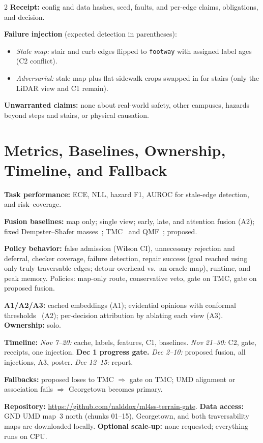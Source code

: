 \documentclass[10pt]{article}
\newcommand{\cl}[1]{\texttt{#1}}
\begin{document}
\begin{multicols*}{2}
\textbf{Receipt:} config and data hashes, seed, faults, and per-edge claims, obligations, and decision.

\textbf{Failure injection} (expected detection in parentheses):
\begin{itemize}\setlength\itemsep{0pt}\setlength\parskip{0pt}
	\item \emph{Stale map:} stair and curb edges flipped to \cl{footway} with assigned label ages (C2 conflict).
	\item \emph{Adversarial:} stale map plus flat-sidewalk crops swapped in for stairs (only the LiDAR view and C1 remain).
\end{itemize}

\textbf{Unwarranted claims:} none about real-world safety, other campuses, hazards beyond steps and
stairs, or physical causation.

\section{Metrics, Baselines, Ownership, Timeline, and Fallback}

\textbf{Task performance:} ECE, NLL, hazard F1, AUROC for stale-edge detection, and risk--coverage.

\textbf{Fusion baselines:} map only; single view; early, late, and attention fusion (A2); fixed
Dempster--Shafer masses~\cite{valente2018}; TMC~\cite{han2023} and QMF~\cite{zhang2023}; proposed.

\textbf{Policy behavior:} false admission (Wilson CI), unnecessary rejection and deferral, checker
coverage, failure detection, repair success (goal reached using only truly traversable edges; detour
overhead vs.\ an oracle map), runtime, and peak memory. Policies: map-only route, conservative veto,
gate on TMC, gate on proposed fusion.

\textbf{A1/A2/A3:} cached embeddings (A1); evidential opinions with conformal
thresholds~\cite{Angelopoulos2021} (A2); per-decision attribution by ablating each view (A3).
\textbf{Ownership:} solo.

\textbf{Timeline:} \emph{Nov 7--20:} cache, labels, features, C1, baselines.
\emph{Nov 21--30:} C2, gate, receipts, one injection. \textbf{Dec 1 progress gate.}
\emph{Dec 2--10:} proposed fusion, all injections, A3, poster. \emph{Dec 12--15:} report.

\textbf{Fallbacks:} proposed loses to TMC
$\Rightarrow$ gate on TMC; UMD alignment or association fails $\Rightarrow$ Georgetown becomes primary.

\textbf{Repository:} \url{https://github.com/nalddox/ml4ss-terrain-gate}.
\textbf{Data access:} GND UMD map~3 north (chunks 01--15), Georgetown, and both traversability
maps are downloaded locally. \textbf{Optional scale-up:} none requested; everything runs on CPU.

\end{multicols*}

\clearpage



\end{document}
